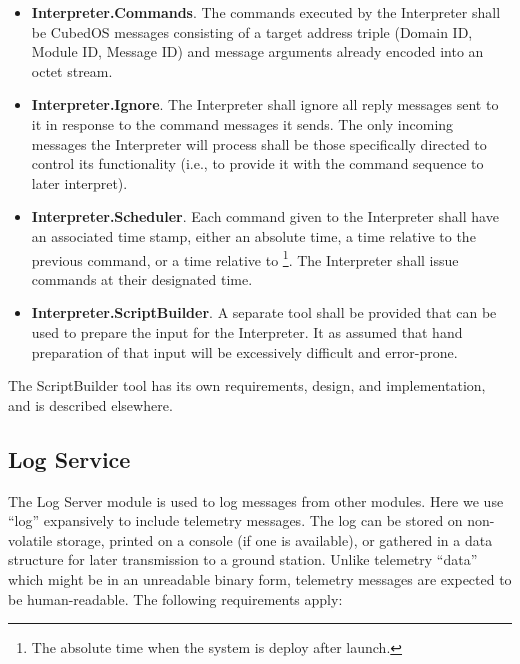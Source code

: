 \begin{itemize}
\item \textbf{Interpreter.Commands}. The commands executed by the Interpreter shall be CubedOS
  messages consisting of a target address triple (Domain ID, Module ID, Message ID) and message
  arguments already encoded into an octet stream.
\item \textbf{Interpreter.Ignore}. The Interpreter shall ignore all reply messages sent to it in
  response to the command messages it sends. The only incoming messages the Interpreter will
  process shall be those specifically directed to control its functionality (i.e., to provide it
  with the command sequence to later interpret).
\item \textbf{Interpreter.Scheduler}. Each command given to the Interpreter shall have an
  associated time stamp, either an absolute time, a time relative to the previous command, or a
  time relative to \footnote{The absolute time when the system is
    deploy after launch.}. The Interpreter shall issue commands at their designated time.
\item \textbf{Interpreter.ScriptBuilder}. A separate tool shall be provided that can be used to
  prepare the input for the Interpreter. It as assumed that hand preparation of that input will
  be excessively difficult and error-prone.
\end{itemize}

The ScriptBuilder tool has its own requirements, design, and implementation, and is described
elsewhere.

\subsection{Log Service}
\label{sec:log-service}

The Log Server module is used to log messages from other modules.  Here we
use ``log'' expansively to include telemetry messages. The log can be stored on non-volatile
storage, printed on a console (if one is available), or gathered in a data structure for later
transmission to a ground station. Unlike telemetry ``data'' which might be in an unreadable
binary form, telemetry messages are expected to be human-readable. The following requirements
apply:

